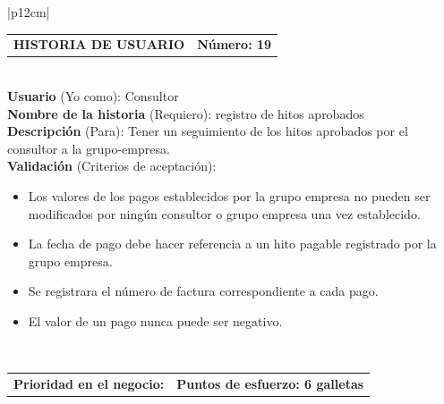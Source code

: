\documentclass[11pt,letterpaper]{report}
\begin{document}
	\begin{center}	
		\begin{tabular}{|p{12cm}|}
			\hline
			\begin{tabular}{c|c}
				\textbf{HISTORIA DE USUARIO} & \textbf{Número: 19} \\
			\end{tabular} \\ \hline
			\textbf{Usuario} (Yo como): Consultor \\ \hline
			\textbf{Nombre de la historia} (Requiero): registro de hitos aprobados \\ \hline
			\textbf{Descripción} (Para): Tener un seguimiento de los hitos aprobados por el consultor a la grupo-empresa. \\ \hline
			\textbf{Validación} (Criterios de aceptación): \\
			\begin{minipage}{12cm}
				\begin{itemize}
					\item Los valores de los pagos establecidos por la grupo empresa no pueden ser modificados por ningún consultor o grupo empresa una vez establecido.
					\item La fecha de pago debe hacer referencia a un hito pagable registrado por la grupo empresa.
					\item Se registrara el número de factura correspondiente a cada pago.
					\item El valor de un pago nunca puede ser negativo.
				\end{itemize}
			\end{minipage} \\ \hline
			\begin{tabular}{p{6cm}|c}
				\textbf{Prioridad en el negocio: } & \textbf{Puntos de esfuerzo: 6 galletas} \\
			\end{tabular} \\ \hline
		\end{tabular}
	\end{center}
	
\end{document}
